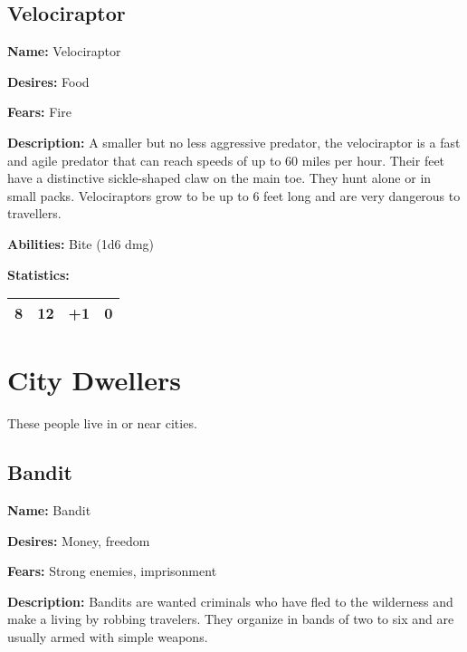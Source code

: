 \begin{multicols}{2}
\subsection{Velociraptor}

\textbf{Name:} Velociraptor

\textbf{Desires:} Food

\textbf{Fears:} Fire

\textbf{Description:} A smaller but no less aggressive predator, the velociraptor
is a fast and agile predator that can reach speeds of up to 60 miles per hour. Their
feet have a distinctive sickle-shaped claw on the main toe. They hunt alone or in small packs.
Velociraptors grow to be up to 6 feet long and are very dangerous to travellers.

\textbf{Abilities:} Bite (1d6 dmg)

\textbf{Statistics:}

\begin{center}
{
\begin{xtabular}{|l|l|l|l|}
8 & 12 & +1 & 0 \\
\hline
\end{xtabular}
}
\end{center}

\section{City Dwellers}

These people live in or near cities.

\subsection{Bandit}

\textbf{Name:} Bandit

\textbf{Desires:} Money, freedom

\textbf{Fears:} Strong enemies, imprisonment

\textbf{Description:} Bandits are wanted criminals who have fled to the wilderness and make
a living by robbing travelers. They organize in bands of two to six and are usually armed with
simple weapons.


\end{multicols}
